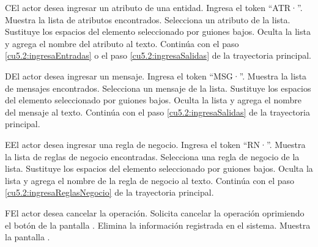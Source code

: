  \begin{UCtrayectoriaA}{C}{El actor desea ingresar un atributo de una entidad.}
 	\UCpaso[\UCactor] Ingresa el token ``ATR·''.
  	\UCpaso[\UCsist] Muestra la lista de atributos encontrados.
 	\UCpaso[\UCactor] Selecciona un atributo de la lista.
 	\UCpaso[\UCsist] Sustituye los espacios del elemento seleccionado por guiones bajos.
  	\UCpaso[\UCsist] Oculta la lista y agrega el nombre del atributo al texto.
    \UCpaso[] Continúa con el paso \ref{cu5.2:ingresaEntradas} o el paso \ref{cu5.2:ingresaSalidas} de la trayectoria principal.
 \end{UCtrayectoriaA}
 \begin{UCtrayectoriaA}{D}{El actor desea ingresar un mensaje.}
 	 \UCpaso[\UCactor] Ingresa el token ``MSG·''.
 	\UCpaso[\UCsist] Muestra la lista de mensajes encontrados.
 	\UCpaso[\UCactor] Selecciona un mensaje de la lista.
 	\UCpaso[\UCsist] Sustituye los espacios del elemento seleccionado por guiones bajos.
  	\UCpaso[\UCsist] Oculta la lista y agrega el nombre del mensaje al texto.
    \UCpaso[] Continúa con el paso \ref{cu5.2:ingresaSalidas} de la trayectoria principal.
 \end{UCtrayectoriaA}
 \begin{UCtrayectoriaA}{E}{El actor desea ingresar una regla de negocio.}
 	\UCpaso[\UCactor] Ingresa el token ``RN·''.	
 	\UCpaso[\UCsist] Muestra la lista de reglas de negocio encontradas.
 	\UCpaso[\UCactor] Selecciona una regla de negocio de la lista.
 	\UCpaso[\UCsist] Sustituye los espacios del elemento seleccionado por guiones bajos.
  	\UCpaso[\UCsist] Oculta la lista y agrega el nombre de la regla de negocio al texto.
    \UCpaso[] Continúa con el paso \ref{cu5.2:ingresaReglasNegocio} de la trayectoria principal.
 \end{UCtrayectoriaA}
 \begin{UCtrayectoriaA}{F}{El actor desea cancelar la operación.}
    \UCpaso[\UCactor] Solicita cancelar la operación oprimiendo el botón  de la pantalla .
    \UCpaso[\UCsist] Elimina la información registrada en el sistema.
    \UCpaso[\UCsist] Muestra la pantalla .
 \end{UCtrayectoriaA}
